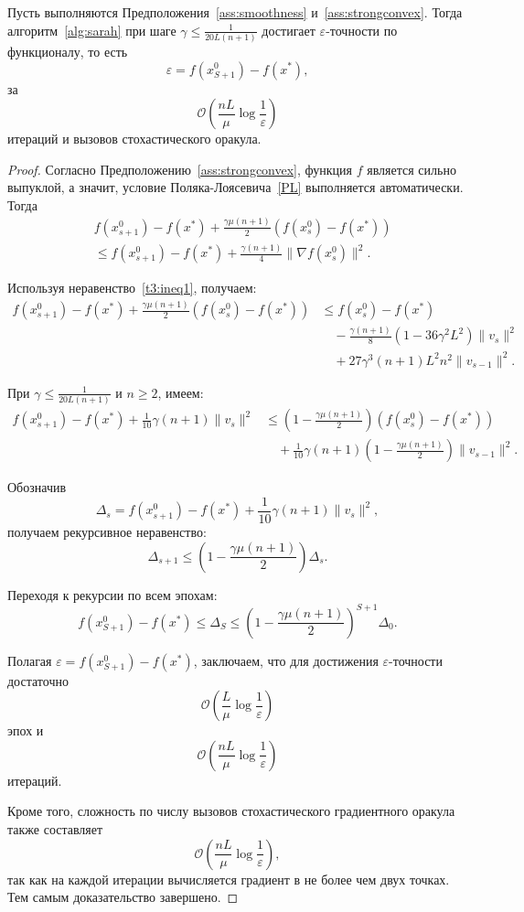 \begin{theorem}\label{theorem4}
Пусть выполняются Предположения~\ref{ass:smoothness} и~\ref{ass:strongconvex}. Тогда алгоритм~\ref{alg:sarah} при шаге $\gamma \leqslant \frac{1}{20L(n+1)}$ достигает $\varepsilon$-точности по функционалу, то есть
\[
\varepsilon = f(x_{S+1}^0) - f(x^*),
\]
за
\[
\mathcal{O} \left(\frac{nL}{\mu}\log \frac{1}{\varepsilon}\right)
\]
итераций и вызовов стохастического оракула.
\begin{proof}
Согласно Предположению~\ref{ass:strongconvex}, функция $f$ является сильно выпуклой, а значит, условие Поляка-Лоясевича~\eqref{PL} выполняется автоматически. Тогда
\begin{align*}
    &f(x_{s+1}^0) - f(x^*) + \frac{\gamma\mu(n+1)}{2} \left( f(x_s^0) - f(x^*) \right)
    \\ &\leqslant f(x_{s+1}^0) - f(x^*) + \frac{\gamma(n+1)}{4} \|\nabla f(x_s^0)\|^2.
\end{align*}

Используя неравенство~\eqref{t3:ineq1}, получаем:
\begin{align*}
    f(x_{s+1}^0) - f(x^*) + \frac{\gamma\mu(n+1)}{2} \left( f(x_s^0) - f(x^*) \right)
    &\leqslant f(x_s^0) - f(x^*) \\
    &\quad - \frac{\gamma(n+1)}{8} \left(1 - 36\gamma^2 L^2 \right) \|v_s\|^2 \\
    &\quad + 27\gamma^3(n+1)L^2 n^2 \|v_{s-1}\|^2.
\end{align*}

При $\gamma \leqslant \frac{1}{20L(n+1)}$ и $n \geqslant 2$, имеем:
\begin{align*}
    f(x_{s+1}^0) - f(x^*) + \frac{1}{10} \gamma(n+1) \|v_s\|^2
    &\leqslant \left(1 - \frac{\gamma\mu(n+1)}{2}\right) \left(f(x_s^0) - f(x^*)\right) \\
    &\quad + \frac{1}{10} \gamma(n+1) \left(1 - \frac{\gamma\mu(n+1)}{2}\right) \|v_{s-1}\|^2.
\end{align*}

Обозначив
\[
\Delta_s = f(x_{s+1}^0) - f(x^*) + \frac{1}{10} \gamma(n+1) \|v_s\|^2,
\]
получаем рекурсивное неравенство:
\[
\Delta_{s+1} \leqslant \left(1 - \frac{\gamma\mu(n+1)}{2} \right) \Delta_s.
\]

Переходя к рекурсии по всем эпохам:
\[
f(x_{S+1}^0) - f(x^*) \leqslant \Delta_S \leqslant \left(1 - \frac{\gamma\mu(n+1)}{2} \right)^{S+1} \Delta_0.
\]

Полагая $\varepsilon = f(x_{S+1}^0) - f(x^*)$, заключаем, что для достижения $\varepsilon$-точности достаточно 
\[
\mathcal{O}\left(\frac{L}{\mu} \log \frac{1}{\varepsilon} \right)
\]
эпох и
\[
\mathcal{O}\left( \frac{nL}{\mu} \log \frac{1}{\varepsilon} \right)
\]
итераций.

Кроме того, сложность по числу вызовов стохастического градиентного оракула также составляет 
\[
\mathcal{O}\left( \frac{nL}{\mu} \log \frac{1}{\varepsilon} \right),
\]
так как на каждой итерации вычисляется градиент в не более чем двух точках. Тем самым доказательство завершено.
\end{proof}
\end{theorem}

